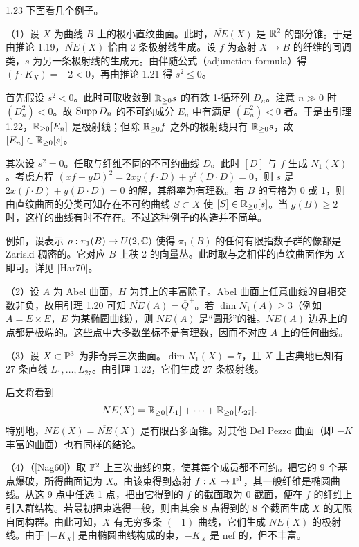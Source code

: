 \begin{example}{1.23}
下面看几个例子。

（1）设 $X$ 为曲线 $B$ 上的极小直纹曲面。此时，$\overline{NE}(X)$ 是 $\mathbb{R}^2$ 的部分锥。于是由推论 1.19，$\overline{NE}(X)$ 恰由 2 条极射线生成。设 $f$ 为态射 $X\to B$ 的纤维的同调类，$s$ 为另一条极射线的生成元。由伴随公式（adjunction formula）得 $(f\cdot K_X)=-2<0$，再由推论 1.21 得 $s^2\le0$。

首先假设 $s^2<0$。此时可取收敛到 $\mathbb{R}_{\ge0}s$ 的有效 1-循环列 $D_n$。注意 $n\gg0$ 时 $(D_n^2)<0$。故 $\operatorname{Supp} D_n$ 的不可约成分 $E_n$ 中有满足 $(E_n^2)<0$ 者。于是由引理 1.22，$\mathbb{R}_{\ge0}[E_n]$ 是极射线；但除 $\mathbb{R}_{\ge0}f$ 之外的极射线只有 $\mathbb{R}_{\ge0}s$，故 $[E_n]\in\mathbb{R}_{\ge0}[s]$。

其次设 $s^2=0$。任取与纤维不同的不可约曲线 $D$。此时 $[D]$ 与 $f$ 生成 $N_1(X)$。考虑方程 $(xf+yD)^2=2xy(f\cdot D)+y^2(D\cdot D)=0$，则 $s$ 是 $2x(f\cdot D)+y(D\cdot D)=0$ 的解，其斜率为有理数。若 $B$ 的亏格为 0 或 1，则由直纹曲面的分类可知存在不可约曲线 $S\subset X$ 使 $[S]\in\mathbb{R}_{\ge0}[s]$。当 $g(B)\ge2$ 时，这样的曲线有时不存在。不过这种例子的构造并不简单。

例如，设表示 $\rho:\pi_1(B)\to U(2,\mathbb{C})$ 使得 $\pi_1(B)$ 的任何有限指数子群的像都是 Zariski 稠密的。它对应 $B$ 上秩 2 的向量丛。此时取与之相伴的直纹曲面作为 $X$ 即可。详见 [Har70]。


（2）设 $A$ 为 Abel 曲面，$H$ 为其上的丰富除子。Abel 曲面上任意曲线的自相交数非负，故用引理 1.20 可知 $\overline{NE}(A)=\overline{Q}^+$。若 $\dim N_1(A)\ge3$（例如 $A=E\times E$，$E$ 为某椭圆曲线），则 $\overline{NE}(A)$ 是“圆形”的锥。$\overline{NE}(A)$ 边界上的点都是极端的。这些点中大多数坐标不是有理数，因而不对应 $A$ 上的任何曲线。

（3）设 $X\subset\mathbb{P}^3$ 为非奇异三次曲面。$\dim N_1(X)=7$，且 $X$ 上古典地已知有 27 条直线 $L_1,\dots,L_{27}$。由引理 1.22，它们生成 27 条极射线。

后文将看到
\[ NE(X)=\mathbb{R}_{\ge0}[L_1]+\cdots+\mathbb{R}_{\ge0}[L_{27}]. \]
特别地，$NE(X)=\overline{NE}(X)$ 是有限凸多面锥。对其他 Del Pezzo 曲面（即 $-K$ 丰富的曲面）也有同样的结论。

（4）（[Nag60]）取 $\mathbb{P}^2$ 上三次曲线的束，使其每个成员都不可约。把它的 9 个基点爆破，所得曲面记为 $X$。由该束得到态射 $f:X\to\mathbb{P}^1$，其一般纤维是椭圆曲线。从这 9 点中任选 1 点，把由它得到的 $f$ 的截面取为 0 截面，便在 $f$ 的纤维上引入群结构。若最初把束选得一般，则由其余 8 点得到的 8 个截面生成 $X$ 的无限自同构群。由此可知，$X$ 有无穷多条 $(-1)$-曲线，它们生成 $\overline{NE}(X)$ 的极射线。由于 $|-K_X|$ 是由椭圆曲线构成的束，$-K_X$ 是 nef 的，但不丰富。
\end{example}

